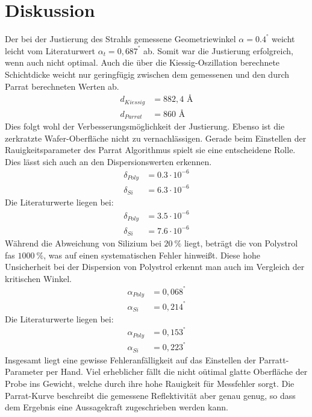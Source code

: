\section{Diskussion}
\label{sec:Diskussion}

Der bei der Justierung des Strahls gemessene Geometriewinkel $\alpha = 0.4^°$ weicht leicht vom Literaturwert $\alpha_{t} = 0,687^°$ ab.
Somit war die Justierung erfolgreich, wenn auch nicht optimal.
Auch die über die Kiessig-Oszillation berechnete Schichtdicke weicht nur geringfügig zwischen dem gemessenen 
und den durch Parrat berechneten Werten ab.
\begin{align*}
    d_{Kiessig} &= 882,4 \text{ \AA} \\
    d_{Parrat} &= 860 \text{ \AA}
\end{align*}
Dies folgt wohl der Verbesserungsmöglichkeit der Justierung.
Ebenso ist die zerkratzte Wafer-Oberfläche nicht zu vernachlässigen.
Gerade beim Einstellen der Rauigkeitsparameter des Parrat Algorithmus spielt sie eine entscheidene Rolle.
Dies lässt sich auch an den Dispersionswerten erkennen.
\begin{align*}
    \delta_{Poly} &= 0.3 \cdot 10^{-6}  \\
    \delta_{Si} &= 6.3 \cdot 10^{-6} 
\end{align*}
Die Literaturwerte \cite{wert} liegen bei:
\begin{align*}
    \delta_{Poly} &= 3.5 \cdot 10^{-6}  \\
    \delta_{Si} &= 7.6 \cdot 10^{-6} 
\end{align*}
Während die Abweichung von Silizium bei $\qty{20}{\percent}$ liegt, beträgt die von Polystrol fas $\qty{1000}{\percent}$,
was auf einen systematischen Fehler hinweißt.
Diese hohe Unsicherheit bei der Dispersion von Polystrol erkennt man auch im Vergleich der kritischen Winkel.
\begin{align*}
    \alpha_{Poly} &= 0,068^°  \\
    \alpha_{Si} &= 0,214^°
\end{align*}
Die Literaturwerte \cite{wert} liegen bei:
\begin{align*}
    \alpha_{Poly} &= 0,153^°  \\
    \alpha_{Si} &= 0,223^°
\end{align*}
Insgesamt liegt eine gewisse Fehleranfälligkeit auf das Einstellen der Parratt-Parameter per Hand.
Viel erheblicher fällt die nicht oütimal glatte Oberfläche der Probe ins Gewicht,
welche durch ihre hohe Rauigkeit für Messfehler sorgt. 
Die Parrat-Kurve beschreibt die gemessene Reflektivität aber genau genug, 
so dass dem Ergebnis eine Aussagekraft zugeschrieben werden kann.